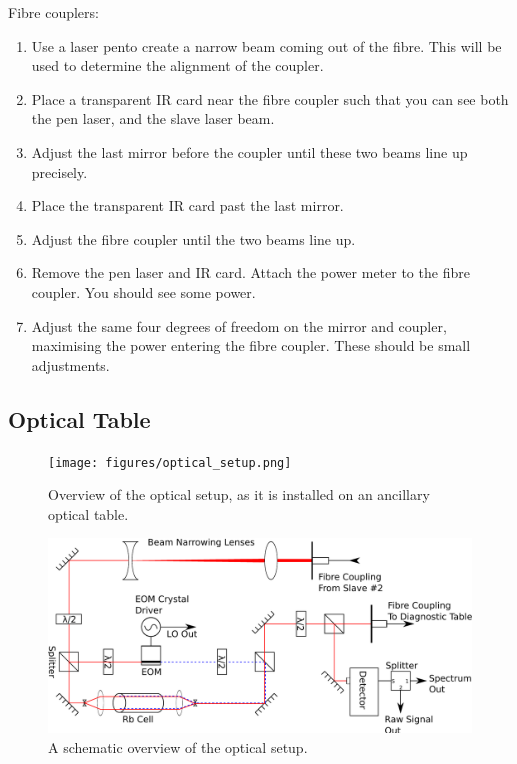 Fibre couplers:

\begin{enumerate}
 \item Use a laser pen\footnotemark to create a narrow beam coming out of the fibre.  This will be used to determine the alignment of the coupler.
 \item Place a transparent IR card near the fibre coupler such that you can see both the pen laser, and the slave laser beam.
 \item Adjust the last mirror before the coupler until these two beams line up precisely.
 \item Place the transparent IR card past the last mirror.
 \item Adjust the fibre coupler until the two beams line up.
 \item Remove the pen laser and IR card.  Attach the power meter to the fibre coupler.  You should see some power.
 \item Adjust the same four degrees of freedom on the mirror and coupler, maximising the power entering the fibre coupler.  These should be small adjustments.
\end{enumerate}


\subsection{Optical Table}

\begin{figure}
  \texttt{[image: figures/optical\_setup.png]}
  \centering\caption{Overview of the optical setup, as it is installed on an ancillary optical table.}
  \label{optical_setup}
\end{figure}

\begin{figure}
  \includegraphics[width=\textwidth]{figures/optics.pdf}
  \centering\caption{A schematic overview of the optical setup.}
  \label{optics}
\end{figure}

